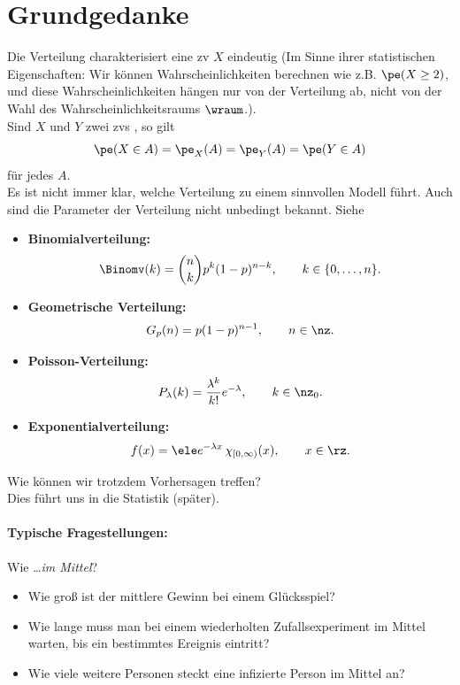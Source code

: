 \section*{Grundgedanke} 
Die Verteilung charakterisiert eine \Gls{zv} $X$ eindeutig (Im Sinne ihrer statistischen Eigenschaften: Wir können Wahrscheinlichkeiten
berechnen wie z.B. $\pe(X \geq 2)$, und diese Wahrscheinlichkeiten hängen nur von der
Verteilung ab, nicht von der Wahl des Wahrscheinlichkeitsraums $\wraum$.). \\
Sind $X$ und $Y$ zwei \Glspl{zv} , so gilt
\[
    \pe(X \in A) = \pe_X(A) = \pe_Y(A) = \pe(Y \in A)
\]
für jedes $A$. \\
Es ist nicht immer klar, welche Verteilung zu einem sinnvollen Modell führt.
Auch sind die Parameter der Verteilung nicht unbedingt bekannt.
Siehe 
\begin{itemize}
    \item \textbf{Binomialverteilung:}
    \[
        \Binomv(k)
        =
        \binom{n}{k}
        p^k (1-p)^{n-k},
        \qquad
        k \in \{0,\dots,n\}.
    \]

    \item \textbf{Geometrische Verteilung:}
    \[
        G_p(n)
        =
        p(1-p)^{n-1},
        \qquad
        n \in \nz.
    \]

    \item \textbf{Poisson-Verteilung:}
    \[
        P_{\lambda}(k)
        =
        \frac{\lambda^k}{k!} e^{-\lambda},
        \qquad
        k \in \nz_0.
    \]

    \item \textbf{Exponentialverteilung:}
    \[
        f(x)
        =
        \ele e^{-\lambda x}\,
        \chi_{[0,\infty)}(x),
        \qquad
        x \in \rz.
    \]
\end{itemize}
Wie können wir trotzdem Vorhersagen treffen? \\ \newline
Dies führt uns in die Statistik (später).

\paragraph{Typische Fragestellungen:} Wie \dots \textit{im Mittel}?  \\
\begin{itemize}
    \item Wie groß ist der mittlere Gewinn bei einem Glücksspiel?
    \item Wie lange muss man bei einem wiederholten Zufallsexperiment im Mittel
    warten, bis ein bestimmtes Ereignis eintritt?
    \item Wie viele weitere Personen steckt eine infizierte Person im Mittel an?
\end{itemize}

